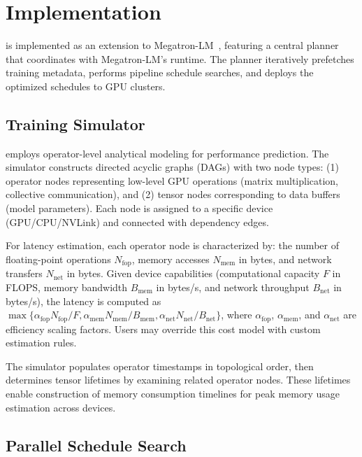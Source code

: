 \section{Implementation}
\label{section:implementation}

\sys{} is implemented as an extension to Megatron-LM~\cite{megatron-lm-arxiv20},
featuring a central planner that coordinates with Megatron-LM's runtime.
The planner iteratively prefetches training metadata, performs pipeline schedule searches,
and deploys the optimized schedules to GPU clusters.

\subsection{Training Simulator}
\label{section:multimodal-training-simulator}

\sys{} employs operator-level analytical modeling for performance prediction.
The simulator constructs directed acyclic graphs (DAGs) with two node types:
(1) operator nodes representing low-level GPU operations (\eg matrix multiplication, collective communication), and
(2) tensor nodes corresponding to data buffers (\eg model parameters).
Each node is assigned to a specific device (GPU/CPU/NVLink) and connected with dependency edges.

For latency estimation, each operator node is characterized by:
the number of floating-point operations $N_\mathrm{fop}$,
memory accesses $N_\mathrm{mem}$ in bytes,
and network transfers $N_\mathrm{net}$ in bytes.
Given device capabilities (computational capacity $F$ in FLOPS,
memory bandwidth $B_\mathrm{mem}$ in bytes/s,
and network throughput $B_\mathrm{net}$ in bytes/s), the latency is computed as
$
\max\{
    \alpha_\mathrm{fop}N_\mathrm{fop}/F,
    \alpha_\mathrm{mem}N_\mathrm{mem}/B_\mathrm{mem},
    \alpha_\mathrm{net}N_\mathrm{net}/B_\mathrm{net}
\}
$,
where $\alpha_\mathrm{fop}$, $\alpha_\mathrm{mem}$, and $\alpha_\mathrm{net}$ are efficiency scaling factors.
Users may override this cost model with custom estimation rules.

The simulator populates operator timestamps in topological order,
then determines tensor lifetimes by examining related operator nodes.
These lifetimes enable construction of memory consumption timelines
for peak memory usage estimation across devices.

\subsection{Parallel Schedule Search}

